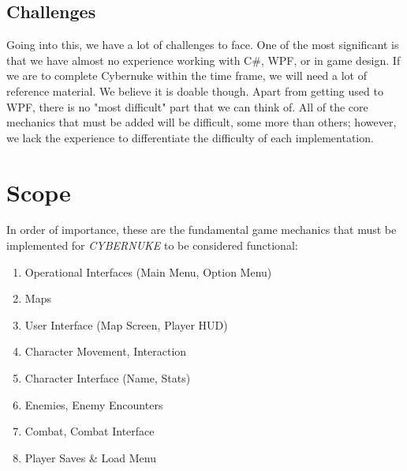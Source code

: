 \documentclass[10pt,conference,onecolumn,compsoc]{IEEEtran}
\begin{document}
\subsection{Challenges}
Going into this, we have a lot of challenges to face. One of the most significant is that we have almost no experience working with C\#, WPF, or in game design. If we are to complete Cybernuke within the time frame, we will need a lot of reference material. We believe it is doable though. 
Apart from getting used to WPF, there is no "most difficult" part that we can think of. All of the core mechanics that must be added will be difficult, some more than others; however, we lack the experience to differentiate the difficulty of each implementation. 



\section{Scope}
In order of importance, these are the fundamental game mechanics that must be implemented for \emph{CYBERNUKE} to be considered functional:
\begin{enumerate}
\item Operational Interfaces (Main Menu, Option Menu)
\item Maps
\item User Interface (Map Screen, Player HUD)
\item Character Movement, Interaction
\item Character Interface (Name, Stats)
\item Enemies, Enemy Encounters
\item Combat, Combat Interface
\item Player Saves \& Load Menu
\end{enumerate} 
\end{document}
